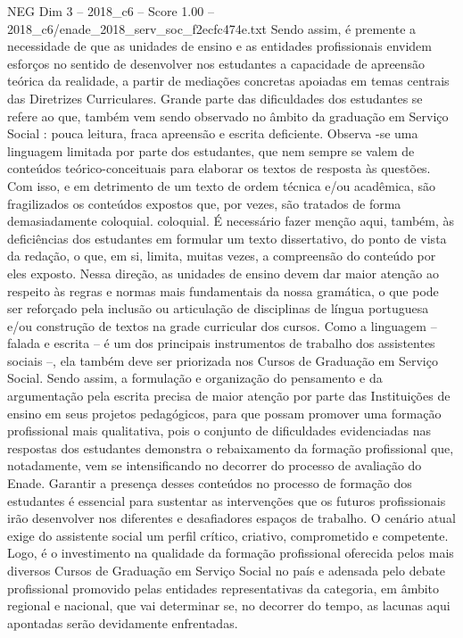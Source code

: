 \begin{textsample}{NEG Dim 3 – 2018\_c6 – Score 1.00 – 2018\_c6/enade\_2018\_serv\_soc\_f2ecfc474e.txt}
Sendo assim, é premente a necessidade de que as unidades de ensino e as entidades profissionais envidem esforços no sentido de desenvolver nos estudantes a capacidade de apreensão teórica da realidade, a partir de mediações concretas apoiadas em temas centrais das Diretrizes Curriculares.
Grande parte das dificuldades dos estudantes se refere ao que, também vem sendo observado no âmbito da graduação em Serviço Social : pouca leitura, fraca apreensão e escrita deficiente.
Observa -se uma linguagem limitada por parte dos estudantes, que nem sempre se valem de conteúdos teórico-conceituais para elaborar os textos de resposta às questões.
Com isso, e em detrimento de um texto de ordem técnica e/ou acadêmica, são fragilizados os conteúdos expostos que, por vezes, são tratados de forma demasiadamente coloquial. coloquial.
É necessário fazer menção aqui, também, às deficiências dos estudantes em formular um texto dissertativo, do ponto de vista da redação, o que, em si, limita, muitas vezes, a compreensão do conteúdo por eles exposto.
Nessa direção, as unidades de ensino devem dar maior atenção ao respeito às regras e normas mais fundamentais da nossa gramática, o que pode ser reforçado pela inclusão ou articulação de disciplinas de língua portuguesa e/ou construção de textos na grade curricular dos cursos.
Como a linguagem – falada e escrita – é um dos principais instrumentos de trabalho dos assistentes sociais –, ela também deve ser priorizada nos Cursos de Graduação em Serviço Social.
Sendo assim, a formulação e organização do pensamento e da argumentação pela escrita precisa de maior atenção por parte das Instituições de ensino em seus projetos pedagógicos, para que possam promover uma formação profissional mais qualitativa, pois o conjunto de dificuldades evidenciadas nas respostas dos estudantes demonstra o rebaixamento da formação profissional que, notadamente, vem se intensificando no decorrer do processo de avaliação do Enade.
Garantir a presença desses conteúdos no processo de formação dos estudantes é essencial para sustentar as intervenções que os futuros profissionais irão desenvolver nos diferentes e desafiadores espaços de trabalho.
O cenário atual exige do assistente social um perfil crítico, criativo, comprometido e competente.
Logo, é o investimento na qualidade da formação profissional oferecida pelos mais diversos Cursos de Graduação em Serviço Social no país e adensada pelo debate profissional promovido pelas entidades representativas da categoria, em âmbito regional e nacional, que vai determinar se, no decorrer do tempo, as lacunas aqui apontadas serão devidamente enfrentadas.

\end{textsample}
